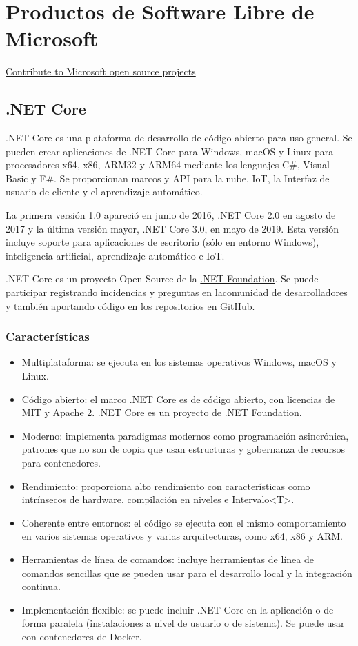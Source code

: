 \section{Productos de Software Libre de Microsoft}
\href{https://opensource.microsoft.com/explore}{Contribute to Microsoft open source projects}
\subsection{.NET Core}
.NET Core es una plataforma de desarrollo de código abierto para uso general. Se pueden crear aplicaciones de .NET Core para Windows, macOS y Linux para procesadores x64, x86, ARM32 y ARM64 mediante los lenguajes C\#, Visual Basic y F\#. Se proporcionan marcos y API para la nube, IoT, la Interfaz de usuario de cliente y el aprendizaje automático.

La primera versión 1.0 apareció en junio de 2016, .NET Core 2.0 en agosto de 2017 y la última versión mayor, .NET Core 3.0, en mayo de 2019. Esta versión incluye soporte para aplicaciones de escritorio (sólo en entorno Windows), inteligencia artificial, aprendizaje automático e IoT.

.NET Core es un proyecto Open Source de la \href{https://dotnetfoundation.org/}{.NET Foundation}. Se puede participar registrando incidencias y preguntas en la\href{https://developercommunity.visualstudio.com/spaces/61/index.html}{comunidad de desarrolladores} y también aportando código en los \href{https://github.com/dotnet/core/blob/master/Documentation/core-repos.md}{repositorios en GitHub}.

\subsubsection{Características}
\begin{itemize}
    \item Multiplataforma: se ejecuta en los sistemas operativos Windows, macOS y Linux.
    \item Código abierto: el marco .NET Core es de código abierto, con licencias de MIT y Apache 2. .NET Core es un proyecto de .NET Foundation.
    \item Moderno: implementa paradigmas modernos como programación asincrónica, patrones que no son de copia que usan estructuras y gobernanza de recursos para contenedores.
    \item Rendimiento: proporciona alto rendimiento con características como intrínsecos de hardware, compilación en niveles e Intervalo<T>.
    \item Coherente entre entornos: el código se ejecuta con el mismo comportamiento en varios sistemas operativos y varias arquitecturas, como x64, x86 y ARM.
    \item Herramientas de línea de comandos: incluye herramientas de línea de comandos sencillas que se pueden usar para el desarrollo local y la integración continua.
    \item Implementación flexible: se puede incluir .NET Core en la aplicación o de forma paralela (instalaciones a nivel de usuario o de sistema). Se puede usar con contenedores de Docker.
\end{itemize}

